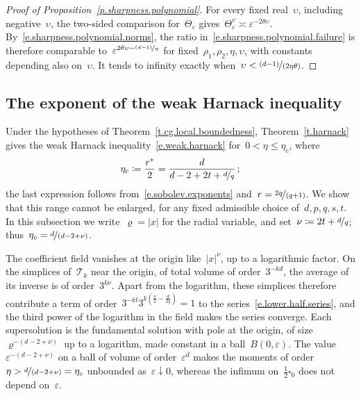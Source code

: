 \documentclass[11pt,letterpaper]{article}
\numberwithin{equation}{section}
\theoremstyle{definition}
\newcommand{\eps}{\varepsilon}
\newcommand{\nf}{\nicefrac}
\newcommand{\cu}{\square}
\begin{document}
\begin{proof}[Proof of Proposition~\ref{p.sharpness.polynomial}]
\smallskip
For every fixed real~$\upsilon$, including negative~$\upsilon$, the two-sided comparison for~$\Theta_\eps$ gives~$\Theta_\eps^\upsilon\asymp\eps^{-2\theta\upsilon}$. By~\eqref{e.sharpness.polynomial.norms}, the ratio in~\eqref{e.sharpness.polynomial.failure} is therefore comparable to~$\eps^{2\theta\upsilon-\nf{(d-1)}\eta}$ for fixed~$\rho_1,\rho_2,\eta,\upsilon$, with constants depending also on~$\upsilon$. It tends to infinity exactly when~$\upsilon<\nf{(d-1)}{(2\eta\theta)}$.
\end{proof}

\subsection{The exponent of the weak Harnack inequality}
\label{ss.sharpness.weak.harnack}

Under the hypotheses of Theorem~\ref{t.cg.local.boundedness}, Theorem~\ref{t.harnack} gives the weak Harnack inequality~\eqref{e.weak.harnack} for~$0<\eta\leq\eta_c$, where
\begin{equation*}
	\eta_c\coloneqq\frac{r^*}2=\frac d{d-2+2t+\nf dq}\,;
\end{equation*}
the last expression follows from~\eqref{e.sobolev.exponents} and~$r=\nf{2q}{(q+1)}$. We show that this range cannot be enlarged, for any fixed admissible choice of~$d,p,q,s,t$. In this subsection we write~$\varrho=|x|$ for the radial variable, and set~$\nu\coloneqq2t+\nf dq$; thus~$\eta_c=\nf d{(d-2+\nu)}$.

\smallskip
The coefficient field vanishes at the origin like~$|x|^\nu$, up to a logarithmic factor. On the simplices of~$\mathscr T_k$ near the origin, of total volume of order~$3^{-kd}$, the average of its inverse is of order~$3^{k\nu}$. Apart from the logarithm, these simplices therefore contribute a term of order~$3^{-kt}3^{k(\frac\nu2-\frac d{2q})}=1$ to the series~\eqref{e.lower.half.series}, and the third power of the logarithm in the field makes the series converge. Each supersolution is the fundamental solution with pole at the origin, of size~$\varrho^{-(d-2+\nu)}$ up to a logarithm, made constant in a ball~$B(0,\eps)$. The value~$\eps^{-(d-2+\nu)}$ on a ball of volume of order~$\eps^d$ makes the moments of order~$\eta>\nf d{(d-2+\nu)}=\eta_c$ unbounded as~$\eps\downarrow0$, whereas the infimum on~$\frac12\cu_0$ does not depend on~$\eps$.
\end{document}
